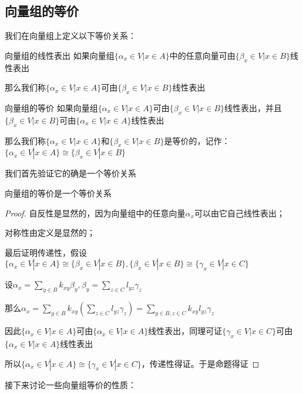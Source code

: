 \documentclass[12pt, a4paper, oneside, UTF8]{ctexbook}
\begin{document}
		\subsection{向量组的等价}
			我们在向量组上定义以下等价关系：
			\begin{defn}{向量组的线性表出}{}
				如果向量组$\{\alpha_x \in V| x \in A\}$中的任意向量可由$\{\beta_x \in V| x \in B\}$线性表出

				那么我们称$\{\alpha_x \in V| x \in A\}$可由$\{\beta _x \in V| x \in B\}$线性表出
			\end{defn}
			\begin{defn}{向量组的等价}{}
				如果向量组$\{\alpha_x \in V| x \in A\}$可由$\{\beta_x \in V| x \in B\}$线性表出，并且$\{\beta_x \in V| x \in B\}$可由$\{\alpha_x \in V| x \in A\}$线性表出

				那么我们称$\{\alpha_x \in V| x \in A\}$和$\{\beta_x \in V| x \in B\}$是等价的，记作：$\{\alpha_x \in V| x \in A\} \cong \{\beta_x \in V| x \in B\}$
			\end{defn}
			我们首先验证它的确是一个等价关系
			\begin{proposition}
				向量组的等价是一个等价关系
			\end{proposition}
			\begin{proof}
				自反性是显然的，因为向量组中的任意向量$\alpha_x$可以由它自己线性表出；

				对称性由定义是显然的；

				最后证明传递性，假设$\{\alpha_x \in V| x \in A\} \cong \{\beta _x \in V| x \in B\},\{\beta _x \in V| x \in B\}\cong\{\gamma _x \in V| x \in C\}$

				设$\alpha_x = \sum\limits_{y \in B} k_{xy} \beta_y,\beta_y = \sum\limits_{z \in C} l_{yz} \gamma_z$

				那么$\alpha_x = \sum\limits_{y \in B} k_{xy} \left(\sum\limits_{z \in C} l_{yz} \gamma_z\right)=\sum\limits_{y \in B,z\in C} k_{xy}l_{yz} \gamma_z$

				因此$\{\alpha_x \in V| x \in A\}$可由$\{\alpha_x \in V| x \in A\}$线性表出，同理可证$\{\gamma_x \in V| x \in C\}$可由$\{\alpha_x \in V| x \in A\}$线性表出
				
				所以$\{\alpha_x \in V| x \in A\} \cong \{\gamma_x \in V| x \in C\}$，传递性得证。于是命题得证
			\end{proof}
			接下来讨论一些向量组等价的性质：
\end{document}
